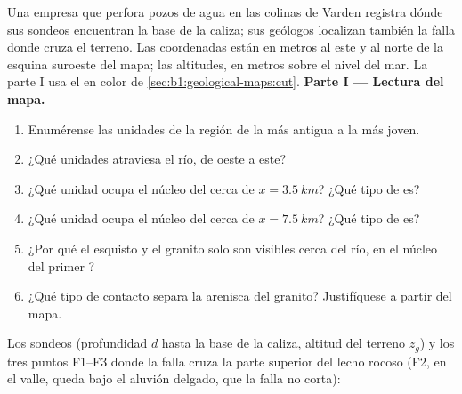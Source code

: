 \begin{problem}
\label{pb:b1:geological-maps:1}
Una empresa que perfora pozos de agua en las colinas de Varden registra dónde sus sondeos
encuentran la base de la caliza; sus geólogos localizan también la falla donde cruza el terreno.
Las coordenadas están en metros al este y al norte de la esquina suroeste del mapa; las altitudes,
en metros sobre el nivel del mar. La parte I usa el  en color de
\cref{sec:b1:geological-maps:cut}.
\medskip
\noindent\textbf{Parte I --- Lectura del mapa.}
\begin{enumerate}
  \item Enumérense las unidades de la región de la más antigua a la más joven.
  \item ¿Qué unidades atraviesa el río, de oeste a este?
  \item ¿Qué unidad ocupa el núcleo del  cerca de $x = \qty{3.5}{km}$? ¿Qué tipo de  es?
  \item ¿Qué unidad ocupa el núcleo del  cerca de $x = \qty{7.5}{km}$? ¿Qué tipo de  es?
  \item ¿Por qué el esquisto y el granito solo son visibles cerca del río, en el núcleo del primer
        ?
  \item ¿Qué tipo de contacto separa la arenisca del granito? Justifíquese a partir del mapa.
\end{enumerate}

\medskip
\noindent Los sondeos (profundidad $d$ hasta la base de la caliza, altitud del terreno $z_g$) y los
tres puntos F1--F3 donde la falla cruza la parte superior del lecho rocoso (F2, en el valle, queda
bajo el aluvión delgado, que la falla no corta):


\end{problem}
